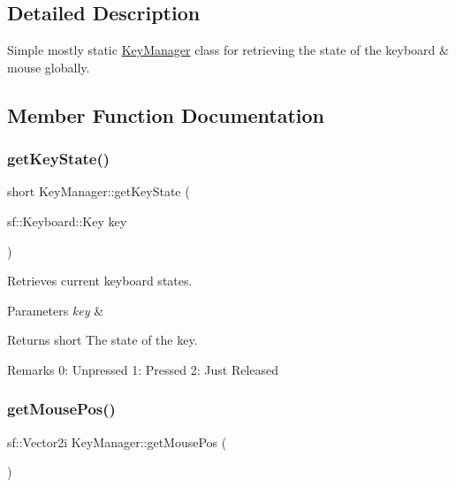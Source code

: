 \subsection{Detailed Description}
Simple mostly static \mbox{\hyperlink{class_key_manager}{Key\+Manager}} class for retrieving the state of the keyboard \& mouse globally. 

\subsection{Member Function Documentation}
\mbox{\label{class_key_manager_a6769c626a0ac7e919979e9128dfb6a88}} 
\subsubsection{\texorpdfstring{get\+Key\+State()}{getKeyState()}}
{\footnotesize\ttfamily short Key\+Manager\+::get\+Key\+State (\begin{DoxyParamCaption}\item[{sf\+::\+Keyboard\+::\+Key}]{key }\end{DoxyParamCaption})\hspace{0.3cm}{\ttfamily [static]}}



Retrieves current keyboard states. 


\begin{DoxyParams}{Parameters}
{\em key} & \\
\hline
\end{DoxyParams}
\begin{DoxyReturn}{Returns}
short The state of the key.
\end{DoxyReturn}
\begin{DoxyRemark}{Remarks}
0\+: Unpressed 1\+: Pressed 2\+: Just Released 
\end{DoxyRemark}
\mbox{\label{class_key_manager_aae40b808bf243100e3da7e63fb8cebe5}} 
\subsubsection{\texorpdfstring{get\+Mouse\+Pos()}{getMousePos()}}
{\footnotesize\ttfamily sf\+::\+Vector2i Key\+Manager\+::get\+Mouse\+Pos (\begin{DoxyParamCaption}{ }\end{DoxyParamCaption})\hspace{0.3cm}{\ttfamily [static]}}



